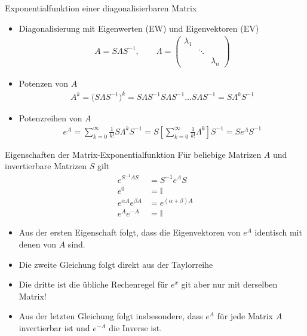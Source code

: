 \begin{frame}{Exponentialfunktion einer diagonalisierbaren Matrix}
  \begin{itemize}
  \item Diagonalisierung mit Eigenwerten (EW) und Eigenvektoren (EV)
    \begin{gather*}
      A = S \Lambda S^{-1},\qquad
      \Lambda =
      \begin{pmatrix}
        \lambda_1\\ &\ddots\\ &&\lambda_n
      \end{pmatrix}
    \end{gather*}
  \item Potenzen von $A$
    \begin{gather*}
      A^k = \bigl(S \Lambda S^{-1}\bigr)^k
      = S \Lambda S^{-1}S \Lambda S^{-1}\dots S \Lambda S^{-1}
      = S \Lambda^k S^{-1}
    \end{gather*}
  \item Potenzreihen von $A$
    \begin{gather*}
      e^A = \sum_{k=0}^\infty \frac1{k!} S \Lambda^k S^{-1}
      = S \left[\sum_{k=0}^\infty \frac1{k!}  \Lambda^k\right] S^{-1}
      = S e^\Lambda S^{-1}
    \end{gather*}
  \end{itemize}
\end{frame}

\begin{frame}{Eigenschaften der Matrix-Exponentialfunktion}
  Für beliebige Matrizen $A$ und invertierbare Matrizen $S$ gilt
  \begin{align*}
    e^{S^{-1}AS} &= S^{-1} e^A S\\
    e^0 &= \mathbb I\\
    e^{\alpha A} e^{\beta A} &= e^{(\alpha+\beta) A}\\
    e^{A}e^{-A} &= \mathbb I
  \end{align*}
  \begin{itemize}
  \item Aus der ersten Eigenschaft folgt, dass die Eigenvektoren von
    $e^A$ identisch mit denen von $A$ sind.
    \item Die zweite Gleichung folgt direkt aus der Taylorreihe
  \item Die dritte ist die übliche Rechenregel für $e^x$ git aber nur mit derselben Matrix!
  \item Aus der letzten Gleichung folgt insbesondere, dass $e^A$ für jede
    Matrix $A$ invertierbar ist und $e^{-A}$ die Inverse ist.
  \end{itemize}
\end{frame}

